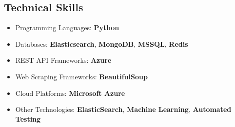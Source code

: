 \documentclass[letterpaper,11pt]{article}
\makeatletter
\newcommand{\resumeItem}[1]{
  \item\small{
	{#1 \vspace{-2pt}}
  }
}
\newcommand{\resumeProjectHeading}[2]{
	\item
	\begin{tabular*}{0.97\textwidth}{l@{\extracolsep{\fill}}r}
  	\small#1 & #2 \\
	\end{tabular*}\vspace{-7pt}
}
\newcommand{\resumeSubHeadingListStart}{\begin{itemize}[leftmargin=0.15in, label={}]}
\newcommand{\resumeSubHeadingListEnd}{\end{itemize}}
\newcommand{\resumeItemListStart}{\begin{itemize}}
\newcommand{\resumeItemListEnd}{\end{itemize}\vspace{-5pt}}
\makeatother
\begin{document}
\begin{center}
\section{Technical Skills}
\begin{itemize}[leftmargin=0.15in, label={}]
\resumeItemListStart
\resumeItem{Programming Languages: \textbf{Python}}
\resumeItem{Databases: \textbf{Elasticsearch}, \textbf{MongoDB}, \textbf{MSSQL}, \textbf{Redis}}
\resumeItem{REST API Frameworks: \textbf{Azure}}
\resumeItem{Web Scraping Frameworks: \textbf{BeautifulSoup}}
\resumeItem{Cloud Platforms: \textbf{Microsoft Azure}}
\resumeItem{Other Technologies: \textbf{ElasticSearch}, \textbf{Machine Learning}, \textbf{Automated Testing}}
\resumeItemListEnd
\end{itemize}
      	
      	



%

\end{center}
\end{document}
